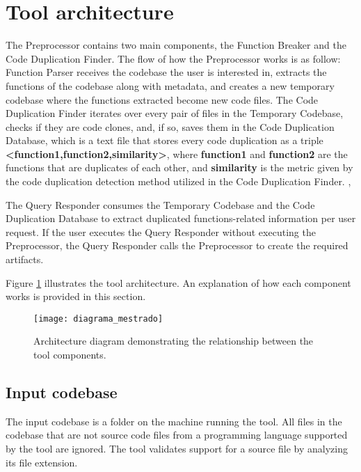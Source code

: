 \en

\section{Tool architecture}
\label{subsec:architecture}

The Preprocessor contains two main components, the Function Breaker and the Code Duplication Finder. 
The flow of how the Preprocessor works is as follow: Function Parser receives the codebase the user is interested in,
extracts the functions of the codebase along with metadata, and creates a new temporary codebase where the functions extracted become new code files. 
The Code Duplication Finder iterates over every pair of files in the Temporary Codebase, checks if they are code clones, and, 
if so, saves them in the Code Duplication Database, which is a text file that stores every code duplication as a triple 
\textbf{<function1,function2,similarity>}, where \textbf{function1} and \textbf{function2} are the functions that are duplicates 
of each other, and \textbf{similarity} is the metric given by the code duplication detection method utilized in the Code Duplication Finder. ,

The Query Responder consumes the Temporary Codebase and the Code Duplication Database to extract duplicated 
functions-related information per user request. If the user executes the Query Responder without executing the 
Preprocessor, the Query Responder calls the Preprocessor to create the required artifacts.

Figure \ref{fig:diagram} illustrates the tool architecture. An explanation of how each component works is provided in this section.

\begin{figure}
\texttt{[image: diagrama\_mestrado]}
\caption{Architecture diagram demonstrating the relationship between the tool components.}
\label{fig:diagram}
\end{figure}

\subsection{Input codebase}

The input codebase is a folder on the machine running the tool. All files in the codebase that are not source code files from a programming language supported by the tool are ignored. The tool validates support for a source file by analyzing its file extension.

